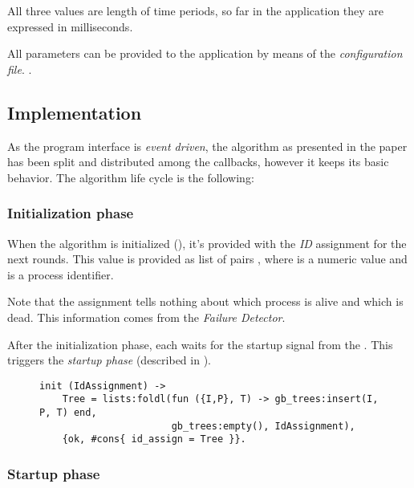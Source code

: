 All three values are length of time periods, so far in the application
they are expressed in milliseconds.

All parameters can be provided to the application by means of the
\emph{configuration file}. .



\subsection{Implementation}

As the program interface is \emph{event driven}, the algorithm as
presented in the paper has been split and distributed among the callbacks,
however it keeps its basic behavior. The algorithm life cycle is the
following:

\subsubsection{Initialization phase}

When the algorithm is initialized (), it's provided
with the \emph{ID} assignment for the next rounds. This value is provided
as list of pairs , where  is a numeric value
and  is a process identifier.

Note that the assignment tells nothing about which process is alive and
which is dead. This information comes from the \emph{Failure Detector}.

After the initialization phase, each  waits for the startup
signal from the . This triggers the \emph{startup phase}
(described in ).

\begin{figure}[tb!]
\begin{lstlisting}[caption={initialization phase},
                   label={code:ConsInit}]
init (IdAssignment) ->
    Tree = lists:foldl(fun ({I,P}, T) -> gb_trees:insert(I, P, T) end,
                       gb_trees:empty(), IdAssignment),
    {ok, #cons{ id_assign = Tree }}.
\end{lstlisting}
\end{figure}

\subsubsection{Startup phase} \label{subsub:ConsStartup}

